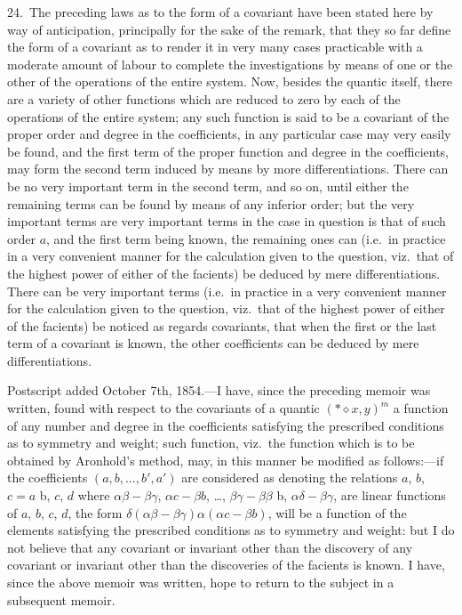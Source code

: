 \documentclass[11pt,a4paper]{article}
\begin{document}
24.\ The preceding laws as to the form of a covariant have been stated here by way of anticipation, principally for the sake of the remark, that they so far define the form of a covariant as to render it in very many cases practicable with a moderate amount of labour to complete the investigations by means of one or the other of the operations of the entire system. Now, besides the quantic itself, there are a variety of other functions which are reduced to zero by each of the operations of the entire system; any such function is said to be a covariant of the proper order and degree in the coefficients, in any particular case may very easily be found, and the first term of the proper function and degree in the coefficients, may form the second term induced by means by more differentiations. There can be no very important term in the second term, and so on, until either the remaining terms can be found by means of any inferior order; but the very important terms are very important terms in the case in question is that of such order $a$, and the first term being known, the remaining ones can (i.e.\ in practice in a very convenient manner for the calculation given to the question, viz.\ that of the highest power of either of the facients) be deduced by mere differentiations. There can be very important terms (i.e.\ in practice in a very convenient manner for the calculation given to the question, viz.\ that of the highest power of either of the facients) be noticed as regards covariants, that when the first or the last term of a covariant is known, the other coefficients can be deduced by mere differentiations.

\medskip

\noindent Postscript added October 7th, 1854.---I have, since the preceding memoir was written, found with respect to the covariants of a quantic $(*\diamond x, y)^m$ a function of any number and degree in the coefficients satisfying the prescribed conditions as to symmetry and weight; such function, viz.\ the function which is to be obtained by Aronhold's method, may, in this manner be modified as follows:---if the coefficients $(a, b, \ldots, b', a')$ are considered as denoting the relations $a$, $b$, $c = a$ b, $c$, $d$ where $\alpha\beta - \beta\gamma$, $\alpha c - \beta b$, \ldots, $\beta\gamma - \beta\beta$ b, $\alpha\delta - \beta\gamma$, are linear functions of $a$, $b$, $c$, $d$, the form $\delta(\alpha\beta - \beta\gamma)\alpha(\alpha c - \beta b)$, will be a function of the elements satisfying the prescribed conditions as to symmetry and weight: but I do not believe that any covariant or invariant other than the discovery of any covariant or invariant other than the discoveries of the facients is known. I have, since the above memoir was written, hope to return to the subject in a subsequent memoir.
\end{document}
